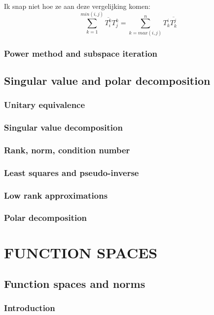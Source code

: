 \documentclass[a4paper,twoside]{article}
\theoremstyle{definition}
\theoremstyle{plain}
\begin{document}
Ik snap niet hoe ze aan deze vergelijking komen:
\[
\sum_{k=1}^{min(i,j)} \overline{T^k_i}T^k_j = \sum_{k=max(i,j)}^{n} T^i_k\overline{T^j_k}
\]
\subsubsection{Power method and subspace iteration}
\subsection{Singular value and polar decomposition}
\subsubsection{Unitary equivalence}
\subsubsection{Singular value decomposition}
\subsubsection{Rank, norm, condition number}
\subsubsection{Least squares and pseudo-inverse}
\subsubsection{Low rank approximations}
\subsubsection{Polar decomposition}

\section{FUNCTION SPACES}
\subsection{Function spaces and norms}
\subsubsection{Introduction}




\end{document}
